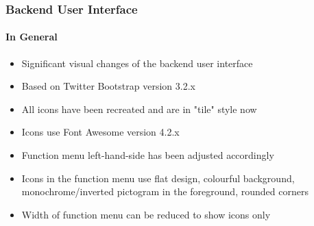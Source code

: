 %

\begin{frame}[fragile]
	\frametitle{Backend User Interface}
	\framesubtitle{In General}

	\begin{itemize}
		\item Significant visual changes of the backend user interface
		\item Based on Twitter Bootstrap version 3.2.x
		\item All icons have been recreated and are in "tile" style now
		\item Icons use Font Awesome version 4.2.x
		\item Function menu left-hand-side has been adjusted accordingly
		\item Icons in the function menu use flat design, colourful background,
			monochrome/inverted pictogram in the foreground, rounded corners
		\item Width of function menu can be reduced to show icons only

	\end{itemize}

\end{frame}


